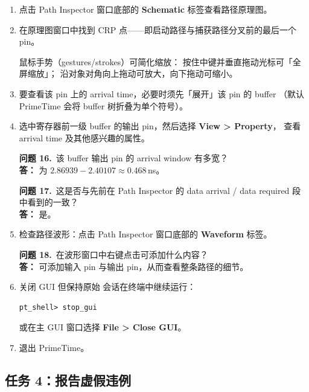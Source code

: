 \begin{enumerate}
  \item 点击 Path Inspector 窗口底部的 \textbf{Schematic} 标签查看路径原理图。

  \item 在原理图窗口中找到 CRP 点——即启动路径与捕获路径分叉前的最后一个 pin。

\begin{noteBox}
鼠标手势（gestures/strokes）可简化缩放：
按住中键并垂直拖动光标可「全屏缩放」；
沿对象对角向上拖动可放大，向下拖动可缩小。
\end{noteBox}

  \item 要查看该 pin 上的 arrival time，必要时须先「展开」该 pin 的 buffer
        （默认 PrimeTime 会将 buffer 树折叠为单个符号）。

  \item 选中寄存器前一级 buffer 的输出 pin，然后选择 \textbf{View > Property}，
        查看 arrival time 及其他感兴趣的属性。

\begin{questionBox}
\textbf{问题 16.}\ 该 buffer 输出 pin 的 arrival window 有多宽？\\[0.35em]
\textbf{答：} 为 $2.86939 - 2.40107 \approx \mathbf{0.468}$\,ns。

\textbf{问题 17.}\ 这是否与先前在 Path Inspector 的 data arrival / data required 段中看到的一致？\\[0.35em]
\textbf{答：} 是。
\end{questionBox}

  \item 检查路径波形：点击 Path Inspector 窗口底部的 \textbf{Waveform} 标签。

\begin{questionBox}
\textbf{问题 18.}\ 在波形窗口中右键点击可添加什么内容？\\[0.35em]
\textbf{答：} 可添加输入 pin 与输出 pin，从而查看整条路径的细节。
\end{questionBox}

  \item 关闭 GUI 但保持原始  会话在终端中继续运行：
\begin{lstlisting}
pt_shell> stop_gui
\end{lstlisting}
        或在主 GUI 窗口选择 \textbf{File > Close GUI}。

  \item 退出 PrimeTime。
\end{enumerate}

\subsection{任务 4：报告虚假违例}
\label{lab4:task4}

